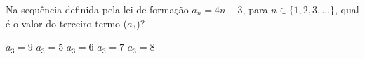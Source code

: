 Na sequência definida pela lei de formação $a_n = 4n-3$, para $n \in \{1, 2, 3, ...\}$, qual é o valor do terceiro termo ($a_3$)?

$a_3=9$
$a_3=5$
$a_3=6$
$a_3=7$
$a_3=8$




